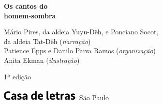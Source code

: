 




\begingroup\thispagestyle{empty}\vspace*{.05\textheight} 

              {\formular
              \huge
              \noindent
              \textbf{Os cantos do\\ 
              homem-sombra}\\
              
              \vspace{-0.5cm}
              
              }

              \vfill              

              {\small
              \noindent{}Mário Pires, da aldeia Yuyu-Dëh, e Ponciano Socot,\\ 
              da aldeia Tat-Dëh (\textit{narração})\vspace{0.2cm}\\
              \noindent{}Patience Epps e Danilo Paiva Ramos (\textit{organização})\vspace{0.2cm}\\
              \noindent{}Anita Ekman (\textit{ilustração})
              }

              \vspace{0.5cm}

              {\small\noindent{}1ª edição}

              \vfill
              
              \noindent\includegraphics[width=0.3\textwidth]{LOGO_CDL.png}
              \break{} 
              \smallskip
              {\fontsize{30}{40}%
              \scriptsize\noindent São Paulo\quad\the\year}

\endgroup
\pagebreak